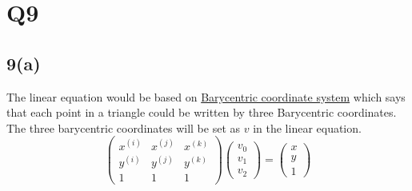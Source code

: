 \documentclass{article}
\begin{document}
\section{Q9}
\subsection*{9(a)}
The linear equation would be based on \hyperref[https://en.wikipedia.org/wiki/Barycentric_coordinate_system]{Barycentric coordinate system} which says that each point in a triangle could be written by three Barycentric coordinates. The three barycentric coordinates will be set as $v$ in the linear equation.
\begin{equation*}
\begin{pmatrix}
x^{(i)} & x^{(j)} & x^{(k)} \\
y^{(i)} & y^{(j)} & y^{(k)} \\
1 & 1 & 1 
\end{pmatrix}
\begin{pmatrix}
v_0 \\
v_1 \\
v_2 
\end{pmatrix}
=
\begin{pmatrix}
x \\
y \\
1 
\end{pmatrix}
\end{equation*}
\end{document}
